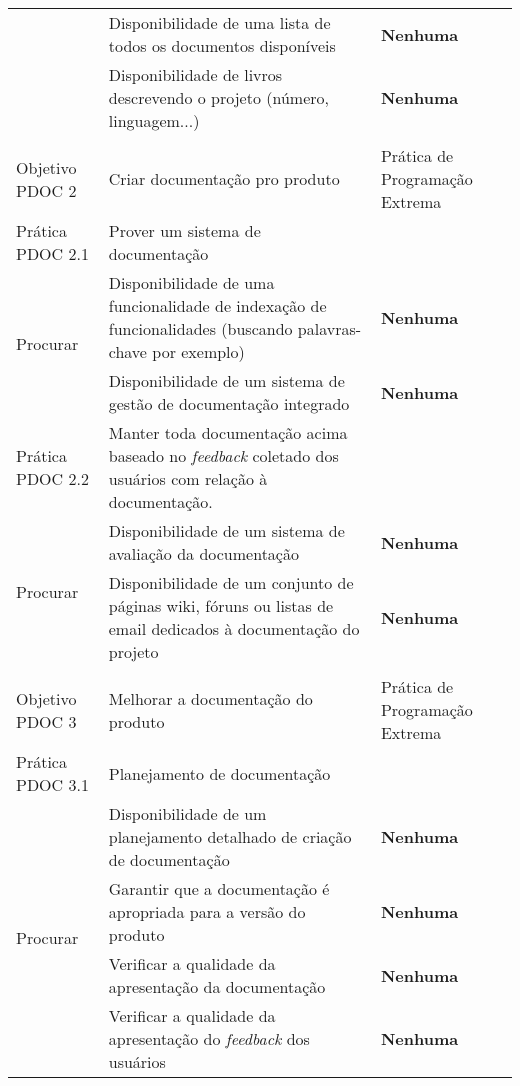\begin{longtable}{|p{2cm}|p{7cm}|p{7cm}|}
  \cline{2-3} & Disponibilidade de uma lista de todos os documentos
  disponíveis &
  \textbf{Nenhuma} \\
  \cline{2-3} & Disponibilidade de livros descrevendo o projeto
  (número, linguagem...) &
  \textbf{Nenhuma} \\
  \hline
  & & \\
  \hline \cellcolor[gray]{0.6} Objetivo PDOC 2 & \cellcolor[gray]{0.6}
  Criar documentação pro produto & Prática de Programação Extrema \\
  \hline \cellcolor[gray]{0.9} Prática PDOC 2.1 &
  \cellcolor[gray]{0.9}
  Prover um sistema de documentação & \\
  \hline \multirow{2}{*}{Procurar} & Disponibilidade de uma
  funcionalidade de indexação de funcionalidades (buscando
  palavras-chave por exemplo) &
  \textbf{Nenhuma} \\
  \cline{2-3} & Disponibilidade de um sistema de gestão de
  documentação integrado &
  \textbf{Nenhuma} \\
  \hline \cellcolor[gray]{0.9} Prática PDOC 2.2 &
  \cellcolor[gray]{0.9} Manter toda documentação acima baseado no
  \textit{feedback}
  coletado dos usuários com relação à documentação. & \\
  \hline \multirow{2}{*}{Procurar} & Disponibilidade de um sistema de
  avaliação da documentação &
  \textbf{Nenhuma} \\
  \cline{2-3} & Disponibilidade de um conjunto de páginas wiki, fóruns
  ou listas de email dedicados à documentação do projeto&
  \textbf{Nenhuma} \\
  \hline
  & & \\
  \hline \cellcolor[gray]{0.6} Objetivo PDOC 3 & \cellcolor[gray]{0.6}
  Melhorar a documentação do produto & Prática de Programação Extrema \\
  \hline \cellcolor[gray]{0.9} Prática PDOC 3.1 &
  \cellcolor[gray]{0.9}
  Planejamento de documentação & \\
  \hline \multirow{4}{*}{Procurar} & Disponibilidade de um
  planejamento detalhado de criação de documentação &
  \textbf{Nenhuma} \\
  \cline{2-3} & Garantir que a documentação é apropriada para a versão
  do produto &
  \textbf{Nenhuma} \\
  \cline{2-3} & Verificar a qualidade da apresentação da documentação
  &
  \textbf{Nenhuma} \\
  \cline{2-3} & Verificar a qualidade da apresentação do
  \textit{feedback} dos usuários &
  \textbf{Nenhuma} \\

\end{longtable}
